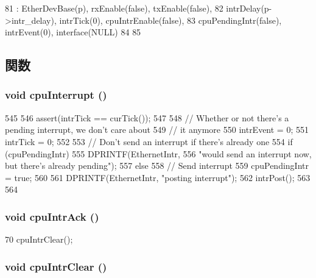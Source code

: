 \begin{DoxyCode}
81     : EtherDevBase(p), rxEnable(false), txEnable(false),
82       intrDelay(p->intr_delay), intrTick(0), cpuIntrEnable(false),
83       cpuPendingIntr(false), intrEvent(0), interface(NULL)
84 {
85 }
\end{DoxyCode}


\subsection{関数}
\hypertarget{classSinic_1_1Base_a6191ac616bb71f81aeb9a72898f5207f}{
\subsubsection[{cpuInterrupt}]{\setlength{\rightskip}{0pt plus 5cm}void cpuInterrupt ()}}
\label{classSinic_1_1Base_a6191ac616bb71f81aeb9a72898f5207f}



\begin{DoxyCode}
545 {
546     assert(intrTick == curTick());
547 
548     // Whether or not there's a pending interrupt, we don't care about
549     // it anymore
550     intrEvent = 0;
551     intrTick = 0;
552 
553     // Don't send an interrupt if there's already one
554     if (cpuPendingIntr) {
555         DPRINTF(EthernetIntr,
556                 "would send an interrupt now, but there's already pending\n");
557     } else {
558         // Send interrupt
559         cpuPendingIntr = true;
560 
561         DPRINTF(EthernetIntr, "posting interrupt\n");
562         intrPost();
563     }
564 }
\end{DoxyCode}
\hypertarget{classSinic_1_1Base_aa1dc801f063bc87ddb1cf8c618ec692e}{
\subsubsection[{cpuIntrAck}]{\setlength{\rightskip}{0pt plus 5cm}void cpuIntrAck ()}}
\label{classSinic_1_1Base_aa1dc801f063bc87ddb1cf8c618ec692e}



\begin{DoxyCode}
70 { cpuIntrClear(); }
\end{DoxyCode}
\hypertarget{classSinic_1_1Base_ab1873826f52c78bed89f2ee53382a4c2}{
\subsubsection[{cpuIntrClear}]{\setlength{\rightskip}{0pt plus 5cm}void cpuIntrClear ()}}
\label{classSinic_1_1Base_ab1873826f52c78bed89f2ee53382a4c2}



